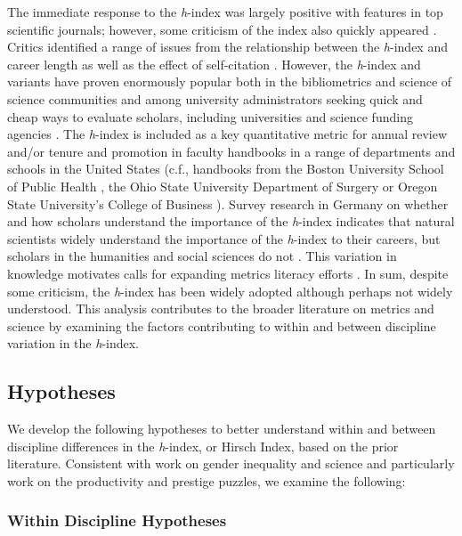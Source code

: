 \documentclass[
  10pt,
  letterpaper,
]{article}
\begin{document}
The immediate response to the \emph{h}-index was largely positive with
features in top scientific journals; however, some criticism of the
index also quickly appeared \citep{barnes_hindex_2017}. Critics
identified a range of issues from the relationship between the
\emph{h}-index and career length as well as the effect of self-citation
\citep[ among others]{kelly_index_2006, purvis_index_2006}. However, the
\emph{h}-index and variants have proven enormously popular both in the
bibliometrics and science of science communities and among university
administrators seeking quick and cheap ways to evaluate scholars,
including universities and science funding agencies
\citep{barnes_hindex_2017}. The \emph{h}-index is included as a key
quantitative metric for annual review and/or tenure and promotion in
faculty handbooks in a range of departments and schools in the United
States (c.f., handbooks from the Boston University School of Public
Health \citep{bostonuniversity_boston_2018}, the Ohio State University
Department of Surgery \citep{ohiostateuniversity_department_2014} or
Oregon State University's College of Business
\citep{oregonstateuniversity_oregon_2020}). Survey research in Germany
on whether and how scholars understand the importance of the
\emph{h}-index indicates that natural scientists widely understand the
importance of the \emph{h}-index to their careers, but scholars in the
humanities and social sciences do not \citep{kamrani_researchers_2021}.
This variation in knowledge motivates calls for expanding metrics
literacy efforts
\citep{ioannidis_citation_2020, maggio_becoming_2022, rousseau_becoming_2018}.
In sum, despite some criticism, the \emph{h}-index has been widely
adopted although perhaps not widely understood. This analysis
contributes to the broader literature on metrics and science by
examining the factors contributing to within and between discipline
variation in the \emph{h}-index.

\subsection{Hypotheses}\label{hypotheses}

We develop the following hypotheses to better understand within and
between discipline differences in the \emph{h}-index, or Hirsch Index,
based on the prior literature. Consistent with work on gender inequality
and science and particularly work on the productivity and prestige
puzzles, we examine the following:

\subsubsection{Within Discipline
Hypotheses}\label{within-discipline-hypotheses}
\end{document}
